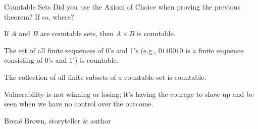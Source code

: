\begin{section}{Countable Sets}
Did you use the Axiom of Choice when proving the previous theorem?  If so, where?

\begin{theorem}
If $A$ and $B$ are countable sets, then $A\times B$ is countable.
\end{theorem}

\begin{theorem}
The set of all finite sequences of 0's and 1's (e.g., $0110010$ is a finite sequence consisting of 0's and 1') is countable. 
\end{theorem}

\begin{theorem}
The collection of all finite subsets of a countable set is countable.
\end{theorem}

\epigraph{Vulnerability is not winning or losing; it's having the courage to show up and be seen when we have no control over the outcome.}{Bren\'e Brown, storyteller \& author}

\end{section}